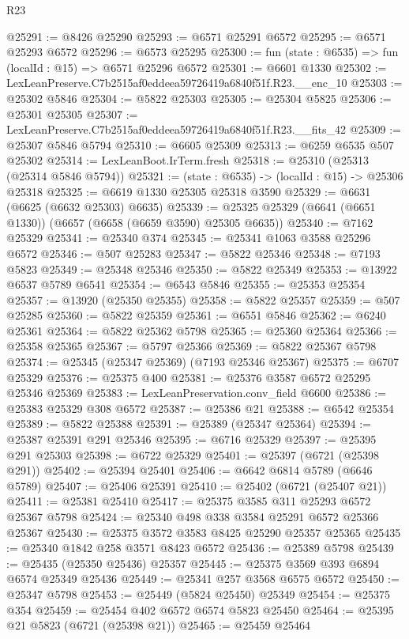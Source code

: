 \begin{lexlean}{R23}
\begin{coremodule}
@25291 := @8426 @25290
@25293 := @6571 @25291 @6572
@25295 := @6571 @25293 @6572
@25296 := @6573 @25295
@25300 := fun (state : @6535) => fun (localId : @15) => @6571 @25296 @6572
@25301 := @6601 @1330
@25302 := LexLeanPreserve.C7b2515af0eddeea59726419a6840f51f.R23.__enc_10
@25303 := @25302 @5846
@25304 := @5822 @25303
@25305 := @25304 @5825
@25306 := @25301 @25305
@25307 := LexLeanPreserve.C7b2515af0eddeea59726419a6840f51f.R23.__fits_42
@25309 := @25307 @5846 @5794
@25310 := @6605 @25309
@25313 := @6259 @6535 @507 @25302
@25314 := LexLeanBoot.IrTerm.fresh
@25318 := @25310 (@25313 (@25314 @5846 @5794))
@25321 := (state : @6535) -> (localId : @15) -> @25306 @25318
@25325 := @6619 @1330 @25305 @25318 @3590
@25329 := @6631 (@6625 (@6632 @25303) @6635)
@25339 := @25325 @25329 (@6641 (@6651 @1330)) (@6657 (@6658 (@6659 @3590) @25305 @6635))
@25340 := @7162 @25329
@25341 := @25340 @374
@25345 := @25341 @1063 @3588 @25296 @6572
@25346 := @507 @25283
@25347 := @5822 @25346
@25348 := @7193 @5823
@25349 := @25348 @25346
@25350 := @5822 @25349
@25353 := @13922 @6537 @5789 @6541
@25354 := @6543 @5846
@25355 := @25353 @25354
@25357 := @13920 (@25350 @25355)
@25358 := @5822 @25357
@25359 := @507 @25285
@25360 := @5822 @25359
@25361 := @6551 @5846
@25362 := @6240 @25361
@25364 := @5822 @25362 @5798
@25365 := @25360 @25364
@25366 := @25358 @25365
@25367 := @5797 @25366
@25369 := @5822 @25367 @5798
@25374 := @25345 (@25347 @25369) (@7193 @25346 @25367)
@25375 := @6707 @25329
@25376 := @25375 @400
@25381 := @25376 @3587 @6572 @25295 @25346 @25369
@25383 := LexLeanPreservation.conv_field @6600
@25386 := @25383 @25329 @308 @6572
@25387 := @25386 @21
@25388 := @6542 @25354
@25389 := @5822 @25388
@25391 := @25389 (@25347 @25364)
@25394 := @25387 @25391 @291 @25346
@25395 := @6716 @25329
@25397 := @25395 @291 @25303
@25398 := @6722 @25329
@25401 := @25397 (@6721 (@25398 @291))
@25402 := @25394 @25401
@25406 := @6642 @6814 @5789 (@6646 @5789)
@25407 := @25406 @25391
@25410 := @25402 (@6721 (@25407 @21))
@25411 := @25381 @25410
@25417 := @25375 @3585 @311 @25293 @6572 @25367 @5798
@25424 := @25340 @498 @338 @3584 @25291 @6572 @25366 @25367
@25430 := @25375 @3572 @3583 @8425 @25290 @25357 @25365
@25435 := @25340 @1842 @258 @3571 @8423 @6572
@25436 := @25389 @5798
@25439 := @25435 (@25350 @25436) @25357
@25445 := @25375 @3569 @393 @6894 @6574 @25349 @25436
@25449 := @25341 @257 @3568 @6575 @6572
@25450 := @25347 @5798
@25453 := @25449 (@5824 @25450) @25349
@25454 := @25375 @354
@25459 := @25454 @402 @6572 @6574 @5823 @25450
@25464 := @25395 @21 @5823 (@6721 (@25398 @21))
@25465 := @25459 @25464

\end{coremodule}
\end{lexlean}
